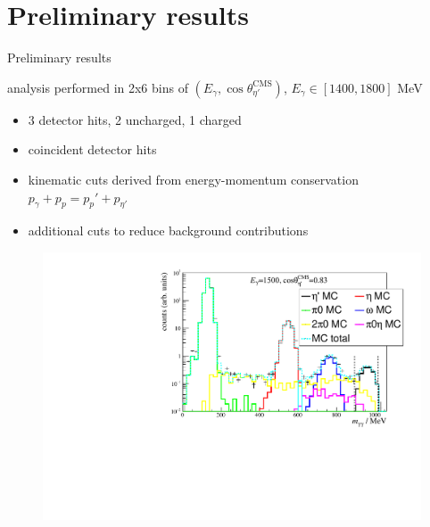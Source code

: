 \documentclass[11pt,aspectratio=169,dvipsnames]{beamer}
\newcommand{\thecolor}{black!70!blue}
\begin{document}
\section{Preliminary results}
\begin{frame}{Preliminary results}

\begin{tcolorbox}[colback=blue!5,colframe=\thecolor,title={Event selection ($\eta'$)}]
	\begin{minipage}{0.49\linewidth}
	analysis performed in 2x6 bins of $(E_\gamma,\cos\theta_{\eta'}^\text{CMS})$, $E_\gamma\in[1400,1800]$ MeV
	\begin{itemize}
		
		\item 3 detector hits, 2 uncharged, 1 charged
		\item coincident detector hits
		\item kinematic cuts derived from energy-momentum conservation $p_\gamma + p_p = p_p'+p_{\eta'}$
		\item additional cuts to reduce background contributions
	\end{itemize}
		\end{minipage}
	\begin{minipage}{.5\linewidth}
		\begin{figure}
			\centering
			\includegraphics[width=1.05\linewidth]{figs/inv_mass_bin.pdf}
		\end{figure}
	\end{minipage}
\end{tcolorbox}



\end{frame}
\end{document}
